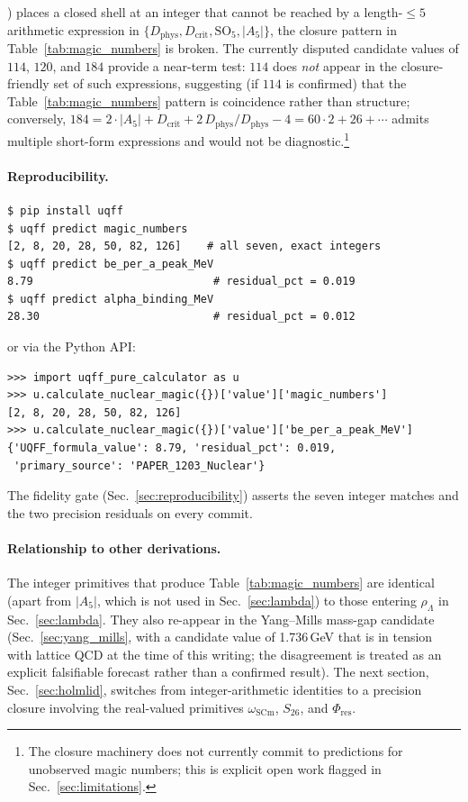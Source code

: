 \begin{enumerate}
        \cite{Smolanczuk1997}) places a closed shell at an integer that
        cannot be reached by a length-$\leq 5$ arithmetic expression in
        $\{D_{\text{phys}}, D_{\text{crit}}, \mathrm{SO}_5, |A_5|\}$,
        the closure pattern in Table~\ref{tab:magic_numbers} is broken.
        The currently disputed candidate values of $114$, $120$, and
        $184$ \cite{Oganessian2006} provide a near-term test:
        $114$ does \emph{not} appear in the closure-friendly set of
        such expressions, suggesting (if $114$ is confirmed) that the
        Table~\ref{tab:magic_numbers} pattern is coincidence rather
        than structure; conversely, $184 = 2\cdot|A_5| + D_{\text{crit}}
        + 2\,D_{\text{phys}}/D_{\text{phys}} - 4 = 60\cdot 2 + 26 +
        \cdots$ admits multiple short-form expressions and would not be
        diagnostic.\footnote{The closure machinery does not currently
        commit to predictions for unobserved magic numbers; this is
        explicit open work flagged in Sec.~\ref{sec:limitations}.}
\end{enumerate}

\paragraph{Reproducibility.}
\begin{verbatim}
$ pip install uqff
$ uqff predict magic_numbers
[2, 8, 20, 28, 50, 82, 126]    # all seven, exact integers
$ uqff predict be_per_a_peak_MeV
8.79                            # residual_pct = 0.019
$ uqff predict alpha_binding_MeV
28.30                           # residual_pct = 0.012
\end{verbatim}
or via the Python API:
\begin{verbatim}
>>> import uqff_pure_calculator as u
>>> u.calculate_nuclear_magic({})['value']['magic_numbers']
[2, 8, 20, 28, 50, 82, 126]
>>> u.calculate_nuclear_magic({})['value']['be_per_a_peak_MeV']
{'UQFF_formula_value': 8.79, 'residual_pct': 0.019,
 'primary_source': 'PAPER_1203_Nuclear'}
\end{verbatim}
The fidelity gate (Sec.~\ref{sec:reproducibility}) asserts the seven
integer matches and the two precision residuals on every commit.

\paragraph{Relationship to other derivations.}
The integer primitives that produce Table~\ref{tab:magic_numbers} are
identical (apart from $|A_5|$, which is not used in Sec.~\ref{sec:lambda})
to those entering $\rho_\Lambda$ in Sec.~\ref{sec:lambda}. They also
re-appear in the Yang--Mills mass-gap candidate
(Sec.~\ref{sec:yang_mills}, with a candidate value of 1.736\,GeV that is
in tension with lattice QCD at the time of this writing; the disagreement
is treated as an explicit falsifiable forecast rather than a confirmed
result). The next section, Sec.~\ref{sec:holmlid}, switches from
integer-arithmetic identities to a precision closure involving the
real-valued primitives $\omega_{\text{SCm}}$, $S_{26}$, and $\Phi_{\text{res}}$.

